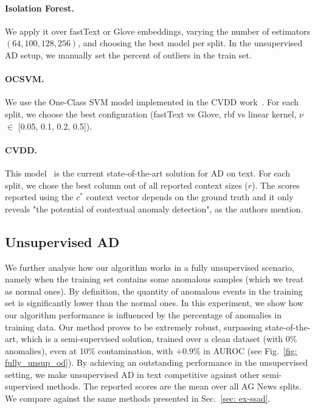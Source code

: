 \documentclass[11pt]{article}
\begin{document}
\paragraph{Isolation Forest.} We apply it over fastText or Glove embeddings, varying the number of estimators $(64, 100, 128, 256)$, and choosing the best model per split. In the unsupervised AD setup, we manually set the percent of outliers in the train set.

\paragraph{OCSVM.} We use the One-Class SVM model implemented in the CVDD work~\footnotemark[\value{footnote}]. For each split, we choose the best configuration (fastText vs Glove, rbf vs linear kernel, $\nu$ $\in$ [0.05, 0.1, 0.2, 0.5]).

\paragraph{CVDD.} This model~\cite{acl2019} is the current state-of-the-art solution for AD on text. For each split, we chose the best column out of all reported context sizes ($r$). The scores reported using the $c^*$ context vector depends on the ground truth and it only reveals "the potential of contextual anomaly detection", as the authors mention.






\subsection{Unsupervised AD}
\label{sec: ex-uad}
We further analyse how our algorithm works in a fully unsupervised scenario, namely when the training set contains some anomalous samples (which we treat as normal ones). By definition, the quantity of anomalous events in the training set is significantly lower than the normal ones. In this experiment, we show how our algorithm performance is influenced by the percentage of anomalies in training data. Our method proves to be extremely robust, surpassing state-of-the-art, which is a semi-supervised solution, trained over a clean dataset (with 0\% anomalies), even at 10\% contamination, with +0.9\% in AUROC (see Fig.~\ref{fig: fully_unsup_od}). By achieving an outstanding performance in the unsupervised setting, we make unsupervised AD in text competitive against other semi-supervised methods. The reported scores are the mean over all AG News splits. We compare against the same methods presented in Sec.~\ref{sec: ex-ssad}.
\end{document}
